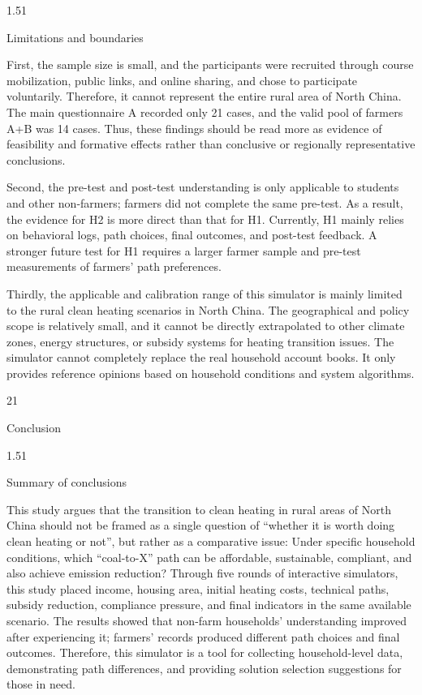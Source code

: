 \documentclass[stu,12pt,floatsintext,donotrepeattitle]{apa7}
\makeatletter
\newcommand{\Sanhao}{\fontsize{16pt}{20pt}\selectfont}
\newcommand{\Sihao}{\fontsize{14pt}{18pt}\selectfont}
\renewcommand{\section}{\@startsection{section}{1}{\z@}%
  {2\baselineskip}{1\baselineskip}%
  {\normalfont\Sanhao\bfseries\raggedright}}
\renewcommand{\subsection}{\@startsection{subsection}{2}{\z@}%
  {1.5\baselineskip}{1\baselineskip}%
  {\normalfont\Sihao\bfseries\raggedright}}
\makeatother
\begin{document}
\subsection{Limitations and boundaries}

First, the sample size is small, and the participants were recruited through course mobilization, public links, and online sharing, and chose to participate voluntarily. Therefore, it cannot represent the entire rural area of North China. The main questionnaire A recorded only 21 cases, and the valid pool of farmers A+B was 14 cases. Thus, these findings should be read more as evidence of feasibility and formative effects rather than conclusive or regionally representative conclusions.

Second, the pre-test and post-test understanding is only applicable to students and other non-farmers; farmers did not complete the same pre-test. As a result, the evidence for H2 is more direct than that for H1. Currently, H1 mainly relies on behavioral logs, path choices, final outcomes, and post-test feedback. A stronger future test for H1 requires a larger farmer sample and pre-test measurements of farmers' path preferences.

Thirdly, the applicable and calibration range of this simulator is mainly limited to the rural clean heating scenarios in North China. The geographical and policy scope is relatively small, and it cannot be directly extrapolated to other climate zones, energy structures, or subsidy systems for heating transition issues. The simulator cannot completely replace the real household account books. It only provides reference opinions based on household conditions and system algorithms.

\section{Conclusion}

\subsection{Summary of conclusions}

This study argues that the transition to clean heating in rural areas of North China should not be framed as a single question of ``whether it is worth doing clean heating or not'', but rather as a comparative issue: Under specific household conditions, which ``coal-to-X'' path can be affordable, sustainable, compliant, and also achieve emission reduction? Through five rounds of interactive simulators, this study placed income, housing area, initial heating costs, technical paths, subsidy reduction, compliance pressure, and final indicators in the same available scenario. The results showed that non-farm households' understanding improved after experiencing it; farmers' records produced different path choices and final outcomes. Therefore, this simulator is a tool for collecting household-level data, demonstrating path differences, and providing solution selection suggestions for those in need.
\end{document}

